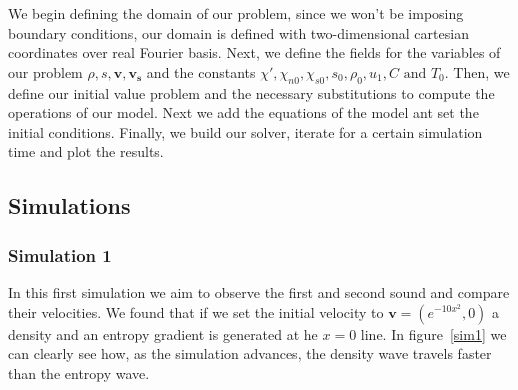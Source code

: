 \documentclass{article}
\begin{document}
We begin defining the domain of our problem, since we won't be imposing boundary conditions, our domain is defined with two-dimensional cartesian coordinates over real Fourier basis.
Next, we define the fields for the variables of our problem \(\rho, s, \mathbf{v}, \mathbf{v_s}\) and the constants \(\chi', \chi_{n0}, \chi_{s0}, s_0, \rho_0, u_1, C \text{ and } T_0\).
Then, we define our initial value problem and the necessary substitutions to compute the operations of our model.
Next we add the equations of the model ant set the initial conditions. 
Finally, we build our solver, iterate for a certain simulation time and plot the results.

\subsection{Simulations}

\subsubsection{Simulation 1}
In this first simulation we aim to observe the first and second sound and compare their velocities.
We found that if we set the initial velocity to \(\mathbf{v} = (e^{-10x^2}, 0)\) a density and an entropy gradient is generated at he \(x=0\) line. 
In figure~\ref{sim1} we can clearly see how, as the simulation advances, the density wave travels faster than the entropy wave.
\end{document}
